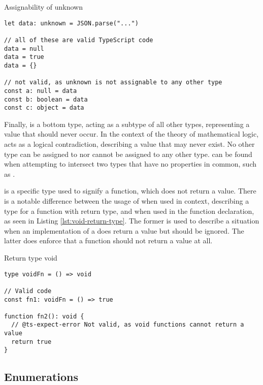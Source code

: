 \begin{listing}[h]
  \caption{Assignability of unknown}\label{lst:unknown-assignability}
  \begin{verbatim}
let data: unknown = JSON.parse("...") 

// all of these are valid TypeScript code
data = null
data = true
data = {}

// not valid, as unknown is not assignable to any other type
const a: null = data
const b: boolean = data
const c: object = data
  \end{verbatim}
\end{listing}

Finally,  is a bottom type, acting as a subtype of all other types, representing a value that should never occur. In the context of the theory of mathematical logic,  acts as a logical contradiction, describing a value that may never exist. No other type can be assigned to  nor  cannot be assigned to any other type.  can be found when attempting to intersect two types that have no properties in common, such as .

 is a specific type used to signify a function, which does not return a value. There is a notable difference between the usage of  when used in context, describing a type for a function with  return type, and when used in the function declaration, as seen in Listing \ref{lst:void-return-type}. The former is used to describe a situation when an implementation of a  does return a value but should be ignored. The latter does enforce that a function should not return a value at all.

\begin{listing}[h]
  \caption{Return type void}\label{lst:void-return-type}
  \begin{verbatim}
type voidFn = () => void

// Valid code
const fn1: voidFn = () => true

function fn2(): void {
  // @ts-expect-error Not valid, as void functions cannot return a value
  return true
}
\end{verbatim}
\end{listing}

\subsection{Enumerations}

